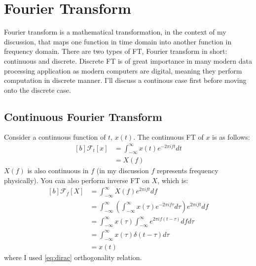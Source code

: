 \documentclass[letterpaper, 11pt]{article}
\newcommand{\fourier}[2]{\mathcal{F}_{#1}[#2]} %
\newcommand{\fint}{\int_{-\infty}^{\infty}} %
\newcommand{\ft}[2]{\fint #2(#1) e^{-2\pi if#1} d#1} %
\newcommand{\ift}[2]{\fint #2(#1) e^{2\pi i#1t} d#1} %
\numberwithin{equation}{section}
\begin{document}
\section{Fourier Transform}
Fourier transform is a mathematical transformation, in the context of my discussion, that maps one function in time domain into another function in frequency domain. There are two types of FT, Fourier transform in short: continuous and discrete. Discrete FT is of great importance in many modern data processing application as modern computers are digital, meaning they perform computation in discrete manner. I'll discuss a continous case first before moving onto the discrete case.

\subsection{Continuous Fourier Transform}
Consider a continuous function of \(t\), \(x(t)\). The continuous FT of \(x\) is as follows:
\begin{equation}
	\begin{aligned}[b]
		\fourier{t}{x}	&= \ft{t}{x}\\
				&= X(f)
	\end{aligned}
\end{equation}
\(X(f)\) is also continuous in \(f\) (in my discussion \(f\) represents frequency physically). You can also perform inverse FT on \(X\), which is:
\begin{equation}
	\begin{aligned}[b]
		\fourier{f}{X}	&= \ift{f}{X} \\
				&= \fint \left({\ft{\tau}{x}}\right) e^{2\pi ift} df\\
				&= \fint x(\tau) \fint e^{2\pi if(t - \tau)} df d\tau \\
				&= \fint x(\tau) \delta (t - \tau) d\tau \\
				&= x(t)
	\end{aligned}
\end{equation}
where I used \eqref{eq:dirac} orthogonality relation.

\end{document}
